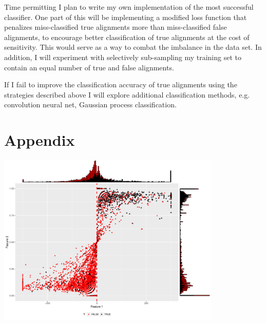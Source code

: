 \documentclass{article}
\newcommand{\beginsupplement}{%
        \renewcommand{\thetable}{S\arabic{table}}%
        \renewcommand{\thefigure}{S\arabic{figure}}%
}
\begin{document}
Time permitting I plan to write my own implementation of the most successful classifier. One part of this will be implementing a modified loss function that penalizes miss-classified true alignments more than miss-classified false alignments, to encourage better classification of true alignments at the cost of sensitivity. This would serve as a way to combat the imbalance in the data set. In addition, I will experiment with selectively sub-sampling my training set to contain an equal number of true and false alignments. 

If I fail to improve the classification accuracy of true alignments using the strategies described above I will explore additional classification methods, e.g. convolution neural net, Gaussian process classification. 

\printbibliography 


\beginsupplement

\section*{Appendix}


\begin{center}
    \includegraphics[width=0.8\textwidth]{FinalProject/LHRbyFRAC.pdf}
    \label{fig:LHR}
\end{center}
\end{document}
